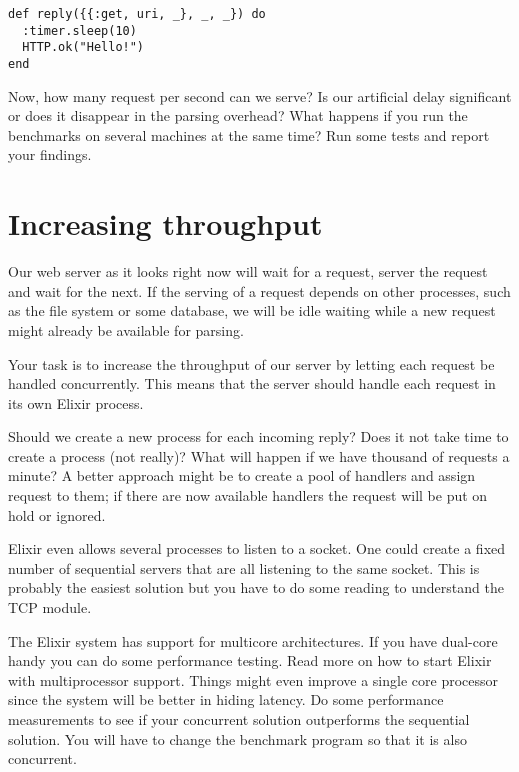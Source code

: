 \documentclass[a4paper,11pt]{article}
\begin{document}
\begin{verbatim}
def reply({{:get, uri, _}, _, _}) do
  :timer.sleep(10)
  HTTP.ok("Hello!")
end
\end{verbatim}

Now, how many request per second can we serve? Is our artificial delay
significant or does it disappear in the parsing overhead? What happens
if you run the benchmarks on several machines at the same time? Run
some tests and report your findings.



\section{Increasing throughput}

Our web server as it looks right now will wait for a request, server
the request and wait for the next. If the serving of a request depends
on other processes, such as the file system or some database, we will
be idle waiting while a new request might already be available for
parsing. 

Your task is to increase the throughput of our server by letting each
request be handled concurrently. This means that the server should
handle each request in its own Elixir process.

Should we create a new process for each incoming reply? Does it not
take time to create a process (not really)? What will happen if we
have thousand of requests a minute? A better approach might be to
create a pool of handlers and assign request to them; if there are now
available handlers the request will be put on hold or ignored.

Elixir even allows several processes to listen to a socket. One could
create a fixed number of sequential servers that are all listening to
the same socket. This is probably the easiest solution but you have
to do some reading to understand the TCP module.

The Elixir system has support for multicore architectures. If you have
dual-core handy you can do some performance testing. Read more on how
to start Elixir with multiprocessor support. Things might even improve
a single core processor since the system will be better in hiding
latency. Do some performance measurements to see if your concurrent
solution outperforms the sequential solution. You will have to change
the benchmark program so that it is also concurrent.
\end{document}
